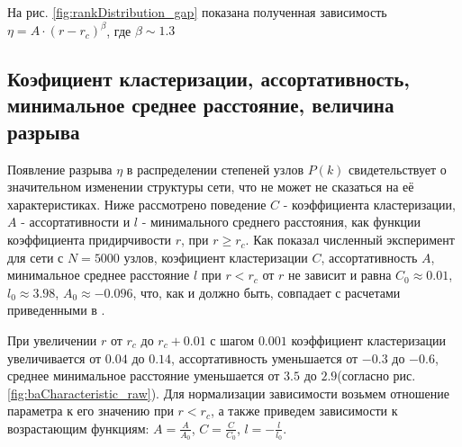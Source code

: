 \documentclass[10pt,aps,pra]{revtex4-1}
\begin{document}
На рис. \ref{fig:rankDistribution_gap} показана полученная зависимость $\eta = A \cdot {(r-r_c)}^\beta$, где $\beta \sim 1.3$

\subsection{Коэфициент кластеризации, ассортативность, минимальное среднее расстояние, величина разрыва}
Появление разрыва $\eta$ в распределении степеней узлов $P(k)$ свидетельствует о значительном изменении структуры сети, что не может не сказаться на её характеристиках. Ниже рассмотрено поведение $C$ - коэффициента кластеризации, $A$ - ассортативности и $l$ - минимального среднего расстояния, как функции коэффициента придирчивости $r$, при $r \geq r_c$. Как показал численный эксперимент для сети с $N=5000$ узлов, коэфициент кластеризации $C$, ассортативность $A$, минимальное среднее расстояние $l$ при $r<r_c$ от $r$ не зависит и равна $C_0 \approx 0.01$, $l_0 \approx 3.98$, $A_0 \approx -0.096$, что, как и должно быть, совпадает с расчетами приведенными в \cite{AlBa2,Newman2}. 

При увеличении $r$ от $r_c$ до $r_c + 0.01$ с шагом $0.001$ коэффициент кластеризации увеличивается от $0.04$ до $0.14$, ассортативность уменьшается от $-0.3$ до $-0.6$, среднее минимальное расстояние уменьшается от $3.5$ до $2.9$(согласно рис. \ref{fig:baCharacteristic_raw}). Для нормализации зависимости возьмем отношение параметра к его значению при $r<r_c$, а также приведем зависимости к возрастающим функциям: $A=\frac{A}{A_0}$, $C=\frac{C}{C_0}$, $l=-\frac{l}{l_0}$.
\end{document}
